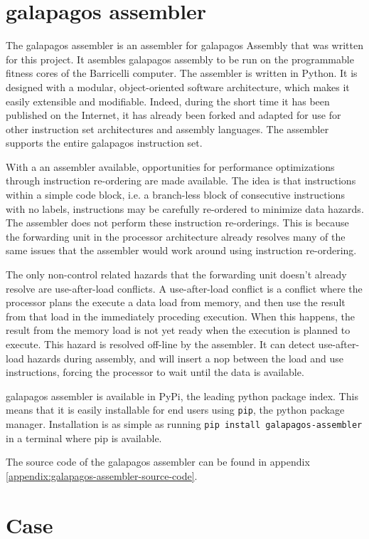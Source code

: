 \section{\Gls{galapagos assembler}}

The \Gls{galapagos assembler} is an assembler for \Gls{galapagos} Assembly that was written for this project.
It asembles galapagos assembly to be run on the programmable fitness cores of the Barricelli computer.
The assembler is written in Python. 
It is designed with a modular, object-oriented software architecture, which makes it easily extensible and modifiable.
Indeed, during the short time it has been published on the Internet, it has already been forked and adapted for use for other instruction set architectures and assembly languages.\cn {}
The assembler supports the entire \Gls{galapagos} instruction set.

With a an assembler available, opportunities for performance optimizations through instruction re-ordering are made available.
The idea is that instructions within a simple code block, i.e. a branch-less block of consecutive instructions with no labels, instructions may be carefully re-ordered to minimize data hazards.
The assembler does not perform these instruction re-orderings.
This is because the forwarding unit in the processor architecture already resolves many of the same issues that the assembler would work around using instruction re-ordering.

The only non-control related hazards that the forwarding unit doesn't already resolve are use-after-load conflicts.
A use-after-load conflict is a conflict where the processor plans the execute a data load from memory, and then use the result from that load in the immediately proceding execution.
When this happens, the result from the memory load is not yet ready when the execution is planned to execute.
This hazard is resolved off-line by the assembler.
It can detect use-after-load hazards during assembly, and will insert a \gls{nop} between the load and use instructions, forcing the processor to wait until the data is available.

\Gls{galapagos assembler} is available in PyPi, the leading python package index.
This means that it is easily installable for end users using \texttt{pip}, the python package manager.
Installation is as simple as running \texttt{pip install galapagos-assembler} in a terminal where pip is available.

The source code of the \Gls{galapagos assembler} can be found in appendix \vref{appendix:galapagos-assembler-source-code}.

\section{Case}

